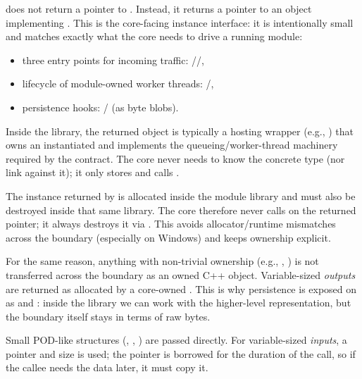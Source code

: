  does not return a pointer to . Instead, it returns a pointer to an object implementing . This is the core-facing instance interface: it is intentionally small and matches exactly what the core needs to drive a running module:
\begin{itemize}
  \item three entry points for incoming traffic: //,
  \item lifecycle of module-owned worker threads: /,
  \item persistence hooks: / (as byte blobs).
\end{itemize}
Inside the library, the returned object is typically a hosting wrapper (e.g., ) that owns an instantiated  and implements the queueing/worker-thread machinery required by the contract. The core never needs to know the concrete  type (nor link against it); it only stores and calls .

The instance returned by  is allocated inside the module library and must also be destroyed inside that same library. The core therefore never calls  on the returned pointer; it always destroys it via . This avoids allocator/runtime mismatches across the boundary (especially on Windows) and keeps ownership explicit.

For the same reason, anything with non-trivial ownership (e.g., , ) is not transferred across the boundary as an owned C++ object. Variable-sized \emph{outputs} are returned as  allocated by a core-owned . This is why persistence is exposed on  as  and : inside the library we can work with the higher-level  representation, but the boundary itself stays in terms of raw bytes.

Small POD-like structures (, , ) are passed directly. For variable-sized \emph{inputs}, a pointer and size is used; the pointer is borrowed for the duration of the call, so if the callee needs the data later, it must copy it.

